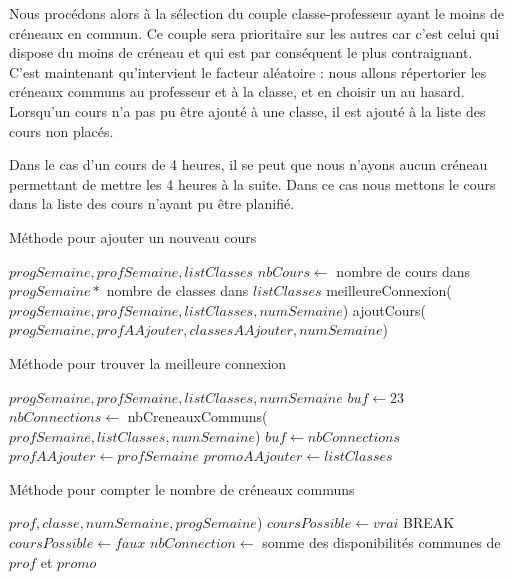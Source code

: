 Nous procédons alors à la sélection du couple classe-professeur ayant le moins de créneaux en commun. Ce couple sera prioritaire sur les autres car c'est celui qui dispose du moins de créneau et qui est par conséquent le plus contraignant.\\

C'est maintenant qu'intervient le facteur aléatoire : nous allons répertorier les créneaux communs au professeur et à la classe, et en choisir un au hasard.\\

Lorsqu'un cours n'a pas pu être ajouté à une classe, il est ajouté à la liste des cours non placés.

Dans le cas d'un cours de 4 heures, il se peut que nous n'ayons aucun créneau permettant de mettre les 4 heures à la suite. Dans ce cas nous mettons le cours dans la liste des cours n'ayant pu être planifié. 

\begin{algorithm}
\caption {Méthode pour ajouter un nouveau cours}
\begin{algorithmic}
\REQUIRE $progSemaine, profSemaine, listClasses$
\STATE $nbCours \leftarrow $ nombre de cours dans $progSemaine * $ nombre de classes dans $listClasses$
\STATE meilleureConnexion($progSemaine, profSemaine, listClasses, numSemaine$)
\STATE ajoutCours($progSemaine, profAAjouter, classesAAjouter, numSemaine$)
\ELSE
{}
\ENDIF
\ENDFOR
{}
\end{algorithmic}
\end{algorithm}

\newpage

\begin{algorithm}
\caption {Méthode pour trouver la meilleure connexion}
\begin{algorithmic}
\REQUIRE $progSemaine, profSemaine, listClasses, numSemaine$
\STATE $buf \leftarrow 23$
\STATE $nbConnections \leftarrow $ nbCreneauxCommuns($profSemaine, listClasses, numSemaine$)
\STATE $buf \leftarrow nbConnections$
\STATE $profAAjouter \leftarrow profSemaine$
\STATE $promoAAjouter \leftarrow listClasses$
\ENDIF
\ENDFOR
\ENDFOR
\end{algorithmic}
\end{algorithm}

\begin{algorithm}
\caption {Méthode pour compter le nombre de créneaux communs}
\begin{algorithmic}
\REQUIRE $prof, classe, numSemaine, progSemaine$)
\STATE $coursPossible \leftarrow vrai$
\STATE BREAK
\ELSE
\STATE $coursPossible \leftarrow faux$
\ENDIF
\ENDFOR
{}
\RETURN $nbConnection \leftarrow $ somme des disponibilités communes de $prof$ et $promo$
\ENDIF
{}
\end{algorithmic}
\end{algorithm}

